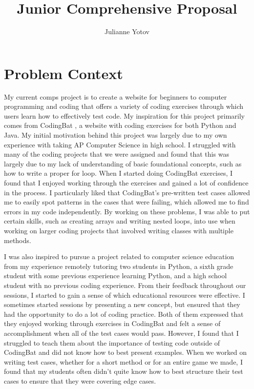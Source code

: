 \documentclass[10pt,twocolumn]{article}
\title{Junior Comprehensive Proposal}
\author{Julianne Yotov}
\affiliation{Occidental College}
\begin{document}
\maketitle

\section{Problem Context}

My current comps project is to create a website for beginners to computer programming and coding that offers a variety of coding exercises through which users learn how to effectively test code. My inspiration for this project primarily comes from CodingBat \cite{CodingBat}, a website with coding exercises for both Python and Java. My initial motivation behind this project was largely due to my own experience with taking AP Computer Science in high school. I struggled with many of the coding projects that we were assigned and found that this was largely due to my lack of understanding of basic foundational concepts, such as how to write a proper for loop. When I started doing CodingBat exercises, I found that I enjoyed working through the exercises and gained a lot of confidence in the process. I particularly liked that CodingBat’s pre-written test cases allowed me to easily spot patterns in the cases that were failing, which allowed me to find errors in my code independently. By working on these problems, I was able to put certain skills, such as creating arrays and writing nested loops, into use when working on larger coding projects that involved writing classes with multiple methods.

I was also inspired to pursue a project related to computer science education from my experience remotely tutoring two students in Python, a sixth grade student with some previous experience learning Python, and a high school student with no previous coding experience. From their feedback throughout our sessions, I started to gain a sense of which educational resources were effective. I sometimes started sessions by presenting a new concept, but ensured that they had the opportunity to do a lot of coding practice. Both of them expressed that they enjoyed working through exercises in CodingBat and felt a sense of accomplishment when all of the test cases would pass. However, I found that I struggled to teach them about the importance of testing code outside of CodingBat and did not know how to best present examples. When we worked on writing test cases, whether for a short method or for an entire game we made, I found that my students often didn’t quite know how to best structure their test cases to ensure that they were covering edge cases. 
\end{document}
